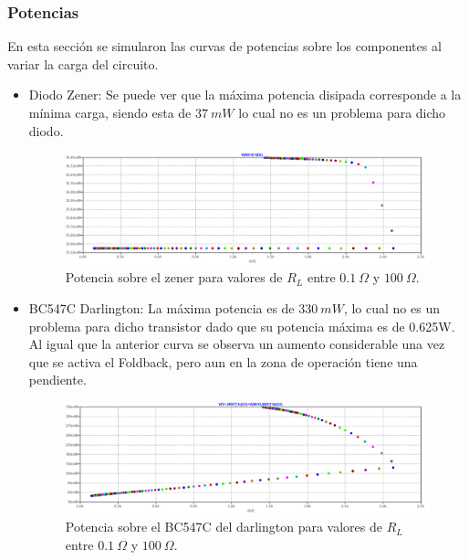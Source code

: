 \subsubsection{Potencias}
\label{sec:sim-pot}
En esta sección se simularon las curvas de potencias sobre los componentes al variar la carga del circuito.

\begin{itemize}
\item Diodo Zener: 
Se puede ver que la máxima potencia disipada corresponde a la mínima carga, siendo esta de $37 \ mW$ lo cual no es un problema para dicho diodo.
\begin{figure}[H]
\centering
	\includegraphics[width=1\textwidth]{ImagenesEjercicio2/potzener.png}
	\caption{Potencia sobre el zener para valores de $R_L$ entre $0.1 \ \Omega$ y $100 \ \Omega$. }
	\label{fig:potzener}
\end{figure}

\item BC547C Darlington: La máxima potencia es de $330 \ mW$, lo cual no es un problema para dicho transistor dado que su potencia máxima es de 0.625W. Al igual que la anterior curva se observa un aumento considerable una vez que se activa el Foldback, pero aun en la zona de operación tiene una pendiente.
\begin{figure}[H]
\centering
	\includegraphics[width=1\textwidth]{ImagenesEjercicio2/potbc547.png}
	\caption{Potencia sobre el BC547C del darlington para valores de $R_L$ entre $0.1 \ \Omega$ y $100 \ \Omega$.}
	\label{fig:potbc547}
\end{figure}


\end{itemize}
